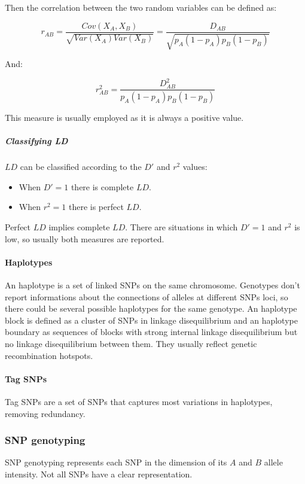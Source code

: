 				Then the correlation between the two random variables can be defined as:

				$$r_{AB} = \frac{Cov(X_A, X_B)}{\sqrt{Var(X_A)Var(X_B)}} = \frac{D_{AB}}{\sqrt{p_A(1-p_A)p_B(1-p_B)}}$$

				And:

				$$r^2_{AB} = \frac{D^2_{AB}}{p_A(1-p_A)p_B(1-p_B)}$$

				This measure is usually employed as it is always a positive value.

				\subparagraph{Classifying LD}
				$LD$ can be classified according to the $D'$ and $r^2$ values:

				\begin{multicols}{2}
					\begin{itemize}
						\item When $D'= 1$ there is complete $LD$.
						\item When $r^2 = 1$ there is perfect $LD$.
					\end{itemize}
				\end{multicols}

				Perfect $LD$ implies complete $LD$.
				There are situations in which $D'=1$ and $r^2$ is low, so usually both measures are reported.

			\paragraph{Haplotypes}
			An haplotype is a set of linked SNPs on the same chromosome.
			Genotypes don't report informations about the connections of alleles at different SNPs loci, so there could be several possible haplotypes for the same genotype.
			An haplotype block is defined as a cluster of SNPs in linkage disequilibrium and an haplotype boundary as sequences of blocks with strong internal linkage disequilibrium but no linkage disequilibrium between them.
			They usually reflect genetic recombination hotspots.

			\paragraph{Tag SNPs}
			Tag SNPs are a set of SNPs that captures most variations in haplotypes, removing redundancy.

		\subsubsection{SNP genotyping}
		SNP genotyping represents each SNP in the dimension of its $A$ and $B$ allele intensity.
		Not all SNPs have a clear representation.


